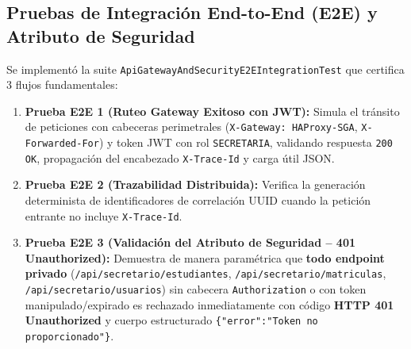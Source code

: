 \documentclass[11pt,a4paper]{article}
\begin{document}
\subsection{Pruebas de Integraci\'on End-to-End (E2E) y Atributo de Seguridad}
Se implement\'o la suite \texttt{ApiGatewayAndSecurityE2EIntegrationTest} que certifica 3 flujos fundamentales:
\begin{enumerate}
  \item \textbf{Prueba E2E 1 (Ruteo Gateway Exitoso con JWT):} Simula el tr\'ansito de peticiones con cabeceras perimetrales (\texttt{X-Gateway: HAProxy-SGA}, \texttt{X-Forwarded-For}) y token JWT con rol \texttt{SECRETARIA}, validando respuesta \texttt{200 OK}, propagaci\'on del encabezado \texttt{X-Trace-Id} y carga \'util JSON.
  \item \textbf{Prueba E2E 2 (Trazabilidad Distribuida):} Verifica la generaci\'on determinista de identificadores de correlaci\'on UUID cuando la petici\'on entrante no incluye \texttt{X-Trace-Id}.
  \item \textbf{Prueba E2E 3 (Validaci\'on del Atributo de Seguridad -- 401 Unauthorized):} Demuestra de manera param\'etrica que \textbf{todo endpoint privado} (\texttt{/api/secretario/estudiantes}, \texttt{/api/secretario/matriculas}, \texttt{/api/secretario/usuarios}) sin cabecera \texttt{Authorization} o con token manipulado/expirado es rechazado inmediatamente con c\'odigo \textbf{HTTP 401 Unauthorized} y cuerpo estructurado \texttt{\{"error":"Token no proporcionado"\}}.
\end{enumerate}
\end{document}
